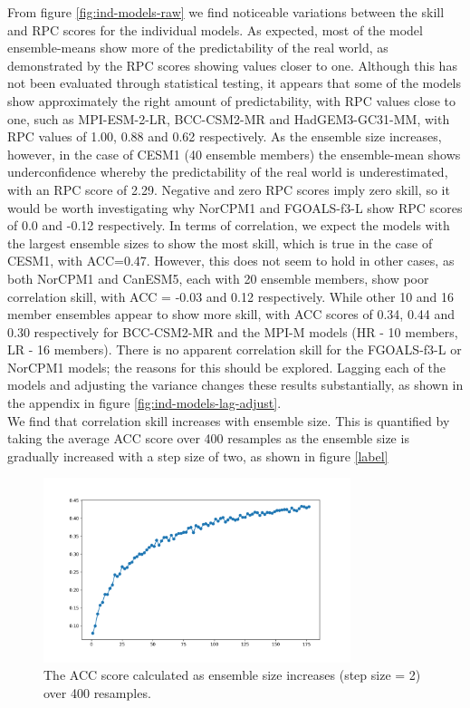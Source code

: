 \documentclass{article}
\begin{document}
From figure \ref*{fig:ind-models-raw} we find noticeable variations between the skill and RPC scores for the individual models. As expected, most of the model ensemble-means show more of the predictability of the real world, as demonstrated by the RPC scores showing values closer to one. Although this has not been evaluated through statistical testing, it appears that some of the models show approximately the right amount of predictability, with RPC values close to one, such as MPI-ESM-2-LR, BCC-CSM2-MR and HadGEM3-GC31-MM, with RPC values of 1.00, 0.88 and 0.62 respectively. As the ensemble size increases, however, in the case of CESM1 (40 ensemble members) the ensemble-mean shows underconfidence whereby the predictability of the real world is underestimated, with an RPC score of 2.29. Negative and zero RPC scores imply zero skill, so it would be worth investigating why NorCPM1 and FGOALS-f3-L show RPC scores of 0.0 and -0.12 respectively. In terms of correlation, we expect the models with the largest ensemble sizes to show the most skill, which is true in the case of CESM1, with ACC=0.47. However, this does not seem to hold in other cases, as both NorCPM1 and CanESM5, each with 20 ensemble members, show poor correlation skill, with ACC = -0.03 and 0.12 respectively. While other 10 and 16 member ensembles appear to show more skill, with ACC scores of 0.34, 0.44 and 0.30 respectively for BCC-CSM2-MR and the MPI-M models (HR - 10 members, LR - 16 members). There is no apparent correlation skill for the FGOALS-f3-L or NorCPM1 models; the reasons for this should be explored. Lagging each of the models and adjusting the variance changes these results substantially, as shown in the appendix in figure \ref{fig:ind-models-lag-adjust}.\\

We find that correlation skill increases with ensemble size. This is quantified by taking the average ACC score over 400 resamples as the ensemble size is gradually increased with a step size of two, as shown in figure \ref*{label} 

\begin{figure}
    \centering
    \includegraphics[width=0.8\textwidth]{plots/members_and_skill.png}
    \caption{The ACC score calculated as ensemble size increases (step size = 2) over 400 resamples.}
    \label{fig:members-skill}
\end{figure}
\end{document}
